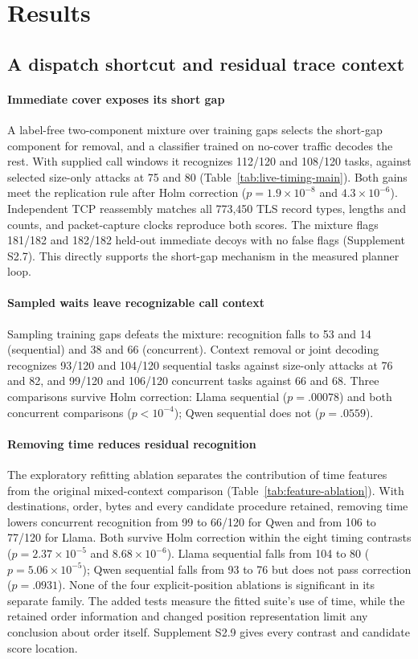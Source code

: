 \section{Results}\label{sec:results}
\subsection{A dispatch shortcut and residual trace context}\label{sec:dispatch}

\paragraph{Immediate cover exposes its short gap}
A label-free two-component mixture over training gaps selects the short-gap component for removal, and a classifier trained on no-cover traffic decodes the rest. With supplied call windows it recognizes 112/120 and 108/120 tasks, against selected size-only attacks at 75 and 80 (Table~\ref{tab:live-timing-main}). Both gains meet the replication rule after Holm correction ($p=1.9\times10^{-8}$ and $4.3\times10^{-6}$). Independent TCP reassembly matches all 773,450 TLS record types, lengths and counts, and packet-capture clocks reproduce both scores. The mixture flags 181/182 and 182/182 held-out immediate decoys with no false flags (Supplement S2.7). This directly supports the short-gap mechanism in the measured planner loop.

\paragraph{Sampled waits leave recognizable call context}
Sampling training gaps defeats the mixture: recognition falls to 53 and 14 (sequential) and 38 and 66 (concurrent). Context removal or joint decoding recognizes 93/120 and 104/120 sequential tasks against size-only attacks at 76 and 82, and 99/120 and 106/120 concurrent tasks against 66 and 68. Three comparisons survive Holm correction: Llama sequential ($p=.00078$) and both concurrent comparisons ($p<10^{-4}$); Qwen sequential does not ($p=.0559$).

\paragraph{Removing time reduces residual recognition}
The exploratory refitting ablation separates the contribution of time features from the original mixed-context comparison (Table~\ref{tab:feature-ablation}). With destinations, order, bytes and every candidate procedure retained, removing time lowers concurrent recognition from 99 to 66/120 for Qwen and from 106 to 77/120 for Llama. Both survive Holm correction within the eight timing contrasts ($p=2.37\times10^{-5}$ and $8.68\times10^{-6}$). Llama sequential falls from 104 to 80 ($p=5.06\times10^{-5}$); Qwen sequential falls from 93 to 76 but does not pass correction ($p=.0931$). None of the four explicit-position ablations is significant in its separate family. The added tests measure the fitted suite's use of time, while the retained order information and changed position representation limit any conclusion about order itself. Supplement S2.9 gives every contrast and candidate score location.


